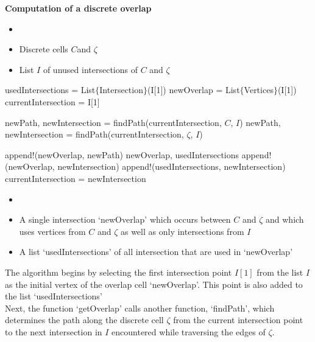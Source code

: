 \begin{algorithm} \textbf{Computation of a discrete overlap} \label{alge:discreteOverlap}
	\begin{itemize} 
		\itemsep0em 
		\item[] 
		\item Discrete cells  $C$and $\zeta$
		\item List $I$ of unused intersections of $C$ and $\zeta$ 
	\end{itemize}
	\begin{algorithmic}
			\State usedIntersections = List$\{$Intersection$\}$(I[1]) 
			\State newOverlap = List$\{$Vertices$\}$(I[1]) 
			\State currentIntersection = I[1]
			
			
					\State newPath, newIntersection = findPath(currentIntersection, $C$, $I$) 
				\Else 
					\State newPath, newIntersection = findPath(currentIntersection, $\zeta$, $I$) 
				\EndIf
				
				\State append!(newOverlap, newPath)
					\State \Return newOverlap, usedIntersections
				\Else 
					\State append!(newOverlap, newIntersection)
					\State append!(usedIntersections, newIntersection) 
					\State currentIntersection = newIntersection
				\EndIf
			\EndFor
		\EndFunction
	\end{algorithmic}
	\begin{itemize} 
		\itemsep0em 
		\item[] 
		\item A single intersection `newOverlap' which occurs between $C$ and $\zeta$ and which uses vertices from  $C$ and $\zeta$ as well as only intersections from $I$
		\item A list `usedIntersections' of all intersection that are used in `newOverlap'
	\end{itemize}	
\end{algorithm}
The algorithm begins by selecting the first intersection point $I[1]$ from the list $I$ as the initial vertex of the overlap cell `newOverlap'. 
This point is also added to the list `usedIntersections' \\
Next, the function `getOverlap' calls another function, `findPath', which determines the path along the discrete cell $\zeta$ from the current intersection point to the next intersection in $I$ encountered while traversing the edges of $\zeta$. 
